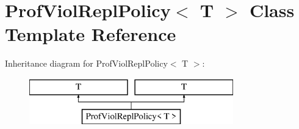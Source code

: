 \hypertarget{classProfViolReplPolicy}{\section{Prof\-Viol\-Repl\-Policy$<$ T $>$ Class Template Reference}
\label{classProfViolReplPolicy}
}
Inheritance diagram for Prof\-Viol\-Repl\-Policy$<$ T $>$\-:\begin{figure}[H]
\begin{center}
\leavevmode
\includegraphics[height=2.000000cm]{classProfViolReplPolicy}
\end{center}
\end{figure}
